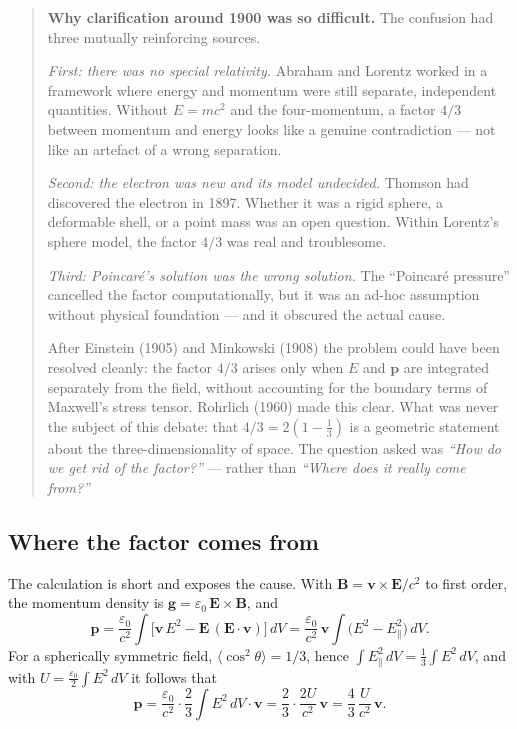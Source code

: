 \begin{quote}
\textbf{Why clarification around 1900 was so difficult.}
The confusion had three mutually reinforcing sources.

\emph{First: there was no special relativity.} Abraham and Lorentz worked
in a framework where energy and momentum were still separate, independent
quantities. Without $E = mc^2$ and the four-momentum, a factor $4/3$
between momentum and energy looks like a genuine contradiction --- not like
an artefact of a wrong separation.

\emph{Second: the electron was new and its model undecided.} Thomson had
discovered the electron in 1897. Whether it was a rigid sphere, a deformable
shell, or a point mass was an open question. Within Lorentz's sphere model,
the factor $4/3$ was real and troublesome.

\emph{Third: Poincaré's solution was the wrong solution.} The
``Poincaré pressure'' cancelled the factor computationally, but it was
an ad-hoc assumption without physical foundation --- and it obscured the
actual cause.

After Einstein (1905) and Minkowski (1908) the problem could have been
resolved cleanly: the factor $4/3$ arises only when $E$ and $\mathbf p$
are integrated separately from the field, without accounting for the
boundary terms of Maxwell's stress tensor. Rohrlich (1960) made this clear.
What was never the subject of this debate: that $4/3 = 2(1-\tfrac{1}{3})$
is a geometric statement about the three-dimensionality of space. The
question asked was \emph{``How do we get rid of the factor?''} --- rather
than \emph{``Where does it really come from?''}
\end{quote}

\subsection{Where the factor comes from \EM}

The calculation is short and exposes the cause. With $\mathbf B =
\mathbf v\times\mathbf E/c^2$ to first order, the momentum density is
$\mathbf g = \varepsilon_0\,\mathbf E\times\mathbf B$, and
\begin{equation}
  \mathbf p = \frac{\varepsilon_0}{c^2}\int
  \bigl[\mathbf v\,E^2 - \mathbf E\,(\mathbf E\cdot\mathbf v)\bigr]\,dV
  = \frac{\varepsilon_0}{c^2}\,\mathbf v \int \bigl(E^2 - E_\parallel^2\bigr)\,dV .
\end{equation}
For a spherically symmetric field, $\langle\cos^2\theta\rangle = 1/3$, hence
$\int E_\parallel^2\,dV = \tfrac13\int E^2\,dV$, and with
$U = \tfrac{\varepsilon_0}{2}\int E^2\,dV$ it follows that
\begin{equation}
  \mathbf p = \frac{\varepsilon_0}{c^2}\cdot\frac{2}{3}\int E^2\,dV\cdot\mathbf v
  = \frac{2}{3}\cdot\frac{2U}{c^2}\,\mathbf v = \frac{4}{3}\,\frac{U}{c^2}\,\mathbf v .
\end{equation}

